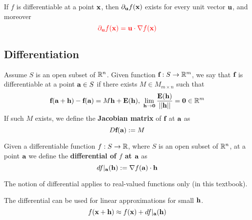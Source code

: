 \documentclass[11pt]{article}
\newcommand{\vef}[0]{\ve{f}}
\begin{document}
				\begin{theorem}
					If $f$ is differentiable at a point $\textbf{x}$, then $\partial_{\textbf{u}} f(\textbf{x})$ exists for every unit vector $\textbf{u}$, and moreover
					\begin{equation}
						\textcolor{red}{\partial_{\textbf{u}} f(\textbf{x}) = \textbf{u} \cdot \nabla f(\textbf{x})}
					\end{equation}
				\end{theorem}
		
		\subsection{Differentiation}
			\begin{definition}
				Assume $S$ is an open subset of $\mathbb{R}^n$. Given function $\vef: S \to \R^m$, we say that $\textbf{f}$ is differentiable at a point $\textbf{a} \in S$ if there exists $M \in M_{m \times n}$ such that
				\begin{equation}
					\vef(\vea + \ve{h}) - \vef(\vea) = M \ve{h} + \ve{E}(\ve{h}),\ \lim_{\ve{h} \to \ve{0}} \frac{\ve{E}(\ve{h})}{\norm{\ve{h}}} = \ve{0} \in \R^m
				\end{equation}
				If such $M$ exists, we define the \textbf{Jacobian matrix} of $\vef$ at $\textbf{a}$ as 
				\begin{equation}
					D\vef(\vea) := M
				\end{equation}
			\end{definition}
			
			\begin{definition}
				Given a differentiable function $f: S \to \mathbb{R}$, where $S$ is an open subset of $\mathbb{R}^n$, at a point $\textbf{a}$ we define the \textbf{differential of $f$ at $\textbf{a}$} as 
				\begin{equation}
					df|_{\textbf{a}}(\textbf{h}) := \nabla f(\textbf{a}) \cdot \textbf{h}
				\end{equation}
			\end{definition}
			
			\begin{remark}
				The notion of differential applies to real-valued functions only (in this textbook).
			\end{remark}
			
			\begin{remark}
				The differential can be used for linear approximations for small $\textbf{h}$.
				\begin{equation}
					f(\textbf{x} + \textbf{h}) \approx f(\textbf{x}) + df|_{\textbf{a}}(\textbf{h})
				\end{equation}
			\end{remark}
			
\end{document}
